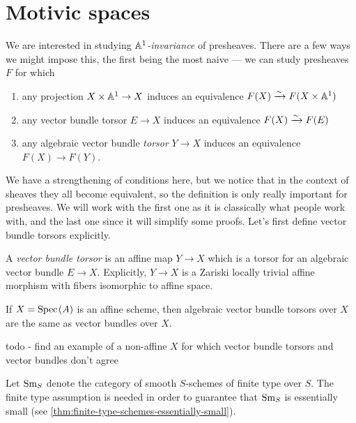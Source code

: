 \documentclass[11pt]{amsart}
\begin{document}
\section{Motivic spaces}

We are interested in studying \textit{$\mathbb{A}^1$-invariance} of presheaves. There are a few ways we might impose this, the first being the most naive --- we can study presheaves $F$ for which
\begin{enumerate}
    \item any projection $X \times \mathbb{A}^1 \to X$ induces an equivalence $F(X) \xrightarrow{\sim} F(X \times \mathbb{A}^1)$
    \item any  vector bundle torsor $E \to X$ induces an equivalence $F(X) \xrightarrow{\sim} F(E)$
    \item any algebraic vector bundle \textit{torsor} $Y \to X$ induces an equivalence $F(X) \to F(Y)$.
\end{enumerate}
We have a strengthening of conditions here, but we notice that in the context of sheaves they all become equivalent, so the definition is only really important for presheaves. We will work with the first one as it is classically what people work with, and the last one since it will simplify some proofs. Let's first define vector bundle torsors explicitly.

\begin{definition} \cite[4.2]{Weibel-KH}
A \textit{vector bundle torsor} is an affine map $Y \to X$ which is a torsor for an algebraic vector bundle $E \to X$. Explicitly, $Y \to X$ is a Zariski locally trivial affine morphism with fibers isomorphic to affine space.
\end{definition}

\begin{example} If $X = \text{Spec}\hspace{0.1em}(A)$ is an affine scheme, then algebraic vector bundle torsors over $X$ are the same as vector bundles over $X$.
\end{example}

todo - find an example of a non-affine $X$ for which vector bundle torsors and vector bundles don't agree

\begin{notation} Let $\mathrm{Sm}_S$ denote the category of smooth $S$-schemes of finite type over $S$. The finite type assumption is needed in order to guarantee that $\mathrm{Sm}_S$ is essentially small (see \autoref{thm:finite-type-schemes-essentially-small}).
\end{notation}
\end{document}
